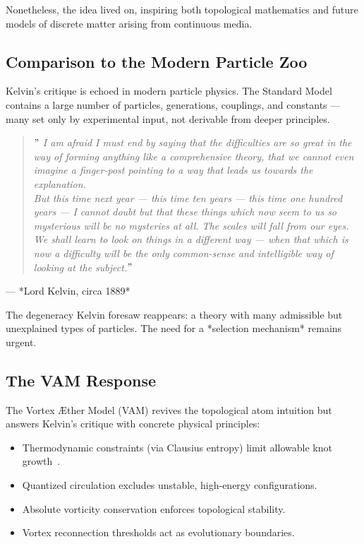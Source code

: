 \documentclass[preprint,notitlepage]{revtex4-2}
\begin{document}
    Nonetheless, the idea lived on, inspiring both topological mathematics and future models of discrete matter arising from continuous media.

    \subsection*{Comparison to the Modern Particle Zoo}

    Kelvin's critique is echoed in modern particle physics. The Standard Model contains a large number of particles, generations, couplings, and constants — many set only by experimental input, not derivable from deeper principles.

    \begin{quote}
    \textit{\("\) I am afraid I must end by saying that the difficulties are so great in the way of forming anything like a comprehensive theory, that we cannot even imagine a finger-post pointing to a way that leads us towards the explanation.} \\
    \textit{But this time next year — this time ten years — this time one hundred years — I cannot doubt but that these things which now seem to us so mysterious will be no mysteries at all. The scales will fall from our eyes. We shall learn to look on things in a different way — when that which is now a difficulty will be the only common-sense and intelligible way of looking at the subject.\("\)}
    \end{quote}
    \hfill — *Lord Kelvin, circa 1889*

    The degeneracy Kelvin foresaw reappears: a theory with many admissible but unexplained types of particles. The need for a *selection mechanism* remains urgent.

    \subsection*{The VAM Response}

    The Vortex Æther Model (VAM) revives the topological atom intuition but answers Kelvin's critique with concrete physical principles:

    \begin{itemize}
      \item Thermodynamic constraints (via Clausius entropy) limit allowable knot growth~\cite{clausius1865entropy}.
      \item Quantized circulation excludes unstable, high-energy configurations.
      \item Absolute vorticity conservation enforces topological stability.
      \item Vortex reconnection thresholds act as evolutionary boundaries.
    \end{itemize}
\end{document}
